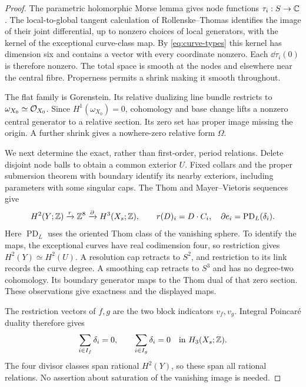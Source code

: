 \begin{proof}
The parametric holomorphic Morse lemma gives node functions
$\tau_i:S\to\mathbb C$. The local-to-global tangent calculation of
Rollenske--Thomas \cite[Section~3, (3.2)]{rollenske-thomas} identifies
the image of their joint differential, up to nonzero choices of local
generators, with the kernel of the exceptional curve-class map. By
\eqref{eq:curve-types} this kernel has dimension six and contains a
vector with every coordinate nonzero. Each $\dd\tau_i(0)$ is therefore
nonzero. The total space is smooth at the nodes and elsewhere near
the central fibre. Properness permits a shrink making it smooth
throughout.

The flat family is Gorenstein. Its relative dualizing line bundle
restricts to $\omega_{X_0}\simeq\mathcal O_{X_0}$. Since
$H^1(\omega_{X_0})=0$, cohomology and base change lifts a nonzero
central generator to a relative section. Its zero set has proper
image missing the origin. A further shrink gives a nowhere-zero
relative form $\Omega$.

We next determine the exact, rather than first-order, period relations.
Delete disjoint node balls to obtain a common exterior $U$. Fixed
collars and the proper submersion theorem with boundary identify its
nearby exteriors, including parameters with some singular caps. The
Thom and Mayer--Vietoris sequences give
\begin{equation}\label{eq:attachment-geometry}
 H^2(Y;\mathbb Z)\xrightarrow{r}\mathbb Z^8
       \xrightarrow{\partial}H^3(X_s;\mathbb Z),\qquad
 r(D)_i=D\cdot C_i,\quad
 \partial e_i=\operatorname{PD}_L(\delta_i).
\end{equation}
Here $\operatorname{PD}_L$ uses the oriented Thom class of the
vanishing sphere. To identify the maps, the exceptional curves have
real codimension four, so restriction gives $H^2(Y)\simeq H^2(U)$.
A resolution cap retracts to $S^2$, and restriction to its link records
the curve degree. A smoothing cap retracts to $S^3$ and has no
degree-two cohomology. Its boundary generator maps to the Thom dual
of that zero section. These observations give exactness and the
displayed maps.

The restriction vectors of $f,g$ are the two block indicators
$v_f,v_g$. Integral Poincaré duality therefore gives
\begin{equation}\label{eq:integral-period-relations}
 \sum_{i\in I_f}\delta_i=0,\qquad
 \sum_{i\in I_g}\delta_i=0
       \quad\hbox{in }H_3(X_s;\mathbb Z).
\end{equation}
The four divisor classes span rational $H^2(Y)$, so these span all
rational relations. No assertion about saturation of the vanishing
image is needed.


\end{proof}
